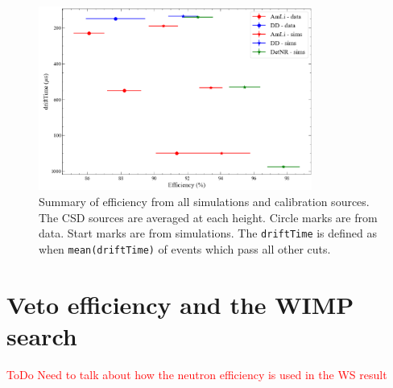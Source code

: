 \begin{figure}[!ht]
	\centering
	\includegraphics[width=0.8\textwidth]{figures/VetoEfficiency/efficiency_summary.png}
	\caption{Summary of efficiency from all simulations and calibration sources.
		The CSD sources are averaged at each height.
		Circle marks are from data.
		Start marks are from simulations.
		The \lstinline{driftTime} is defined as when \lstinline{mean(driftTime)} of events which pass all other cuts.
	}
	\label{fig:VetoEff/efficiency_summary}
\end{figure}
\section{Veto efficiency and the WIMP search}
\textcolor{red}{ToDo Need to talk about how the neutron efficiency is used in the WS result}